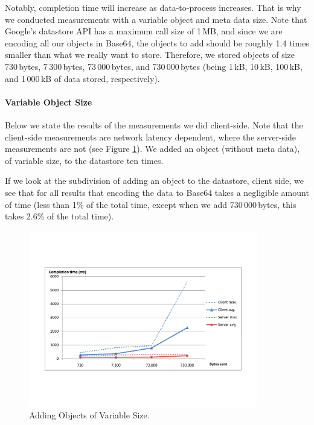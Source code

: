 Notably, completion time will increase as data-to-process increases. That is why
we conducted measurements with a variable object and meta data size. Note that
Google's datastore API has a maximum call size of 1\,MB, and since we are
encoding all our objects in Base64, the objects to add should be roughly 1.4
times smaller than what we really want to store. Therefore, we stored objects 
of size 730\,bytes, 7\,300\,bytes, 73\,000\,bytes, and 730\,000\,bytes (being
1\,kB, 10\,kB, 100\,kB, and 1\,000\,kB of data stored, respectively).

\paragraph{Variable Object Size}
Below we state the results of the measurements we did client-side. Note that
the client-side measurements are network latency dependent, where the
server-side measurements are not (see Figure \ref{add-obj-size}). We added an
object (without meta data), of variable size, to the datastore ten times.

If we look at the subdivision of adding an object to the datastore, client
side, we see that for all results that encoding the data to Base64 takes a
negligible amount of time (less than 1\% of the total time, except when we add
730\,000\,bytes, this takes 2.6\% of the total time). 

\begin{figure} %
\begin{center}
\includegraphics[trim=5cm 4cm 5cm 5cm,width=10cm]{./figures/add_obj.pdf}
\caption{Adding Objects of Variable Size. \label{add-obj-size}}
\end{center}
\end{figure}

